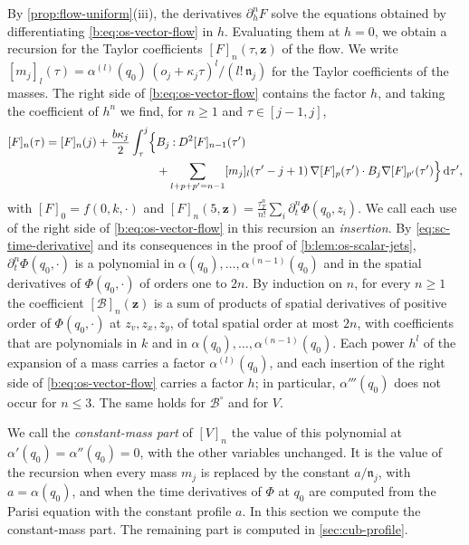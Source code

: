 By \cref{prop:flow-uniform}(iii), the derivatives $\partial_h^nF$ solve the
equations obtained by differentiating \eqref{b:eq:os-vector-flow} in $h$.
Evaluating them at $h=0$, we obtain a recursion for the Taylor coefficients
$[F]_n(\tau,\mathbf z)$ of the flow. We write
$[m_j]_l(\tau)=\alpha^{(l)}(q_0)\,(o_j+\kappa_j\tau)^l/(l!\,\mathfrak n_j)$ for the
Taylor coefficients of the masses. The right side of
\eqref{b:eq:os-vector-flow} contains the factor $h$, and taking the coefficient
of $h^n$ we find, for $n\ge1$ and $\tau\in[j-1,j]$,
\begin{equation}\label{eq:cub-coefficient-recursion}
\begin{aligned}
 [F]_n(\tau)=[F]_n(j)+\frac{b\kappa_j}2\int_\tau^j\Bigl\{&B_j\mathbin:D^2[F]_{n-1}(\tau')\\
 &+\sum_{l+p+p'=n-1}[m_j]_l(\tau'-j+1)\,\nabla[F]_p(\tau')\cdot B_j\nabla[F]_{p'}(\tau')\Bigr\}\dd\tau',
\end{aligned}
\end{equation}
with $[F]_0=f(0,k,\cdot)$ and
$[F]_n(5,\mathbf z)=\frac{\tau_T^n}{n!}\sum_i\partial_t^n\Phi(q_0,z_i)$.
We call each use of the right side of \eqref{b:eq:os-vector-flow} in this
recursion an \emph{insertion}. By \eqref{eq:sc-time-derivative} and its consequences in the proof of
\cref{b:lem:os-scalar-jets}, $\partial_t^n\Phi(q_0,\cdot)$ is a polynomial in
$\alpha(q_0),\dots,\alpha^{(n-1)}(q_0)$ and in the spatial derivatives of
$\Phi(q_0,\cdot)$ of orders one to $2n$. By induction on $n$, for every $n\ge1$ the coefficient
$[\mathcal B]_n(\mathbf z)$ is a sum of products of spatial
derivatives of positive order of $\Phi(q_0,\cdot)$ at $z_v,z_x,z_y$,
of total spatial order at most $2n$, with coefficients
that are polynomials in $k$ and in
$\alpha(q_0),\ldots,\alpha^{(n-1)}(q_0)$. Each power $h^l$ of the
expansion of a mass carries a factor $\alpha^{(l)}(q_0)$, and each insertion
of the right side of \eqref{b:eq:os-vector-flow} carries a factor $h$; in
particular, $\alpha'''(q_0)$ does not occur for $n\le3$. The same holds for
$\mathcal B^\circ$ and for $V$.

We call the \emph{constant-mass part} of $[V]_n$ the value of this polynomial
at $\alpha'(q_0)=\alpha''(q_0)=0$, with the other variables unchanged. It is
the value of the recursion when every mass $m_j$ is replaced by the constant
$a/\mathfrak n_j$, with $a=\alpha(q_0)$, and when the time derivatives of $\Phi$ at
$q_0$ are computed from the Parisi equation with the constant profile $a$. In
this section we compute the constant-mass part. The remaining part is computed
in \cref{sec:cub-profile}.

